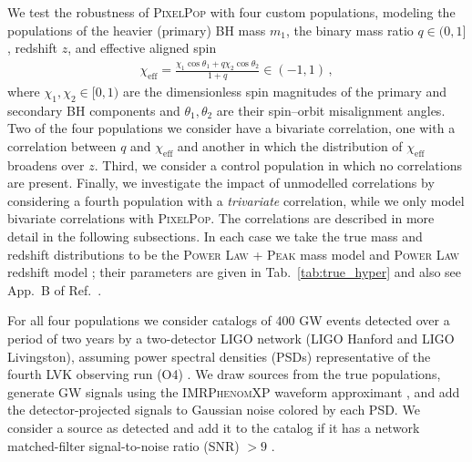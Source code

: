 \begin{refsection}
We test the robustness of \textsc{PixelPop} with four custom populations, modeling the populations of the heavier (primary) BH mass $m_1$, the binary mass ratio $q\in(0,1]$, redshift $z$, and effective aligned spin \cite{Racine:2008qv}
\begin{align}
\chi_\mathrm{eff}
=
\frac
{ \chi_1 \cos\theta_1 + q \chi_2 \cos\theta_2 }
{ 1 + q }
\in (-1,1)
\, ,
\end{align}
where $\chi_1,\chi_2\in[0,1)$ are the dimensionless spin magnitudes of the primary and secondary BH components and $\theta_1,\theta_2$ are their spin--orbit misalignment angles. Two of the four populations we consider have a bivariate correlation, one with a correlation between $q$ and $\chi_\mathrm{eff}$ and another in which the distribution of $\chi_\mathrm{eff}$ broadens over $z$. Third, we consider a control population in which no correlations are present. Finally, we investigate the impact of unmodelled correlations by considering a fourth population with a \textit{trivariate} correlation, while we only model bivariate correlations with \textsc{PixelPop}. The correlations are described in more detail in the following subsections. In each case we take the true mass and redshift distributions to be the \textsc{Power Law + Peak} mass model \cite{Talbot:2018cva} and \textsc{Power Law} redshift model \cite{Fishbach:2018edt}; their parameters are given in Tab.~\ref{tab:true_hyper} and also see App.~B of Ref.~\cite{KAGRA:2021duu}.

For all four populations we consider catalogs of 400 GW events detected over a period of two years by a two-detector LIGO network (LIGO Hanford and LIGO Livingston), assuming power spectral densities (PSDs) representative of the fourth LVK observing run (O4) \cite{KAGRA:2013rdx}. We draw sources from the true populations, generate GW signals using the \textsc{IMRPhenomXP} waveform approximant \cite{Pratten:2020ceb}, and add the detector-projected signals to Gaussian noise colored by each PSD. We consider a source as detected and add it to the catalog if it has a network matched-filter signal-to-noise ratio (SNR) $>9$ \cite{Essick:2023toz, Mould:2023eca}.


\end{refsection}
